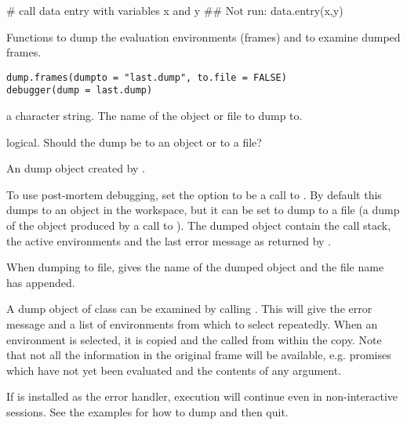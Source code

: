 %
\begin{Examples}
\begin{ExampleCode}
# call data entry with variables x and y
## Not run: data.entry(x,y)
\end{ExampleCode}
\end{Examples}
%
\begin{Description}\relax
Functions to dump the evaluation environments (frames) and to examine
dumped frames.
\end{Description}
%
\begin{Usage}
\begin{verbatim}
dump.frames(dumpto = "last.dump", to.file = FALSE)
debugger(dump = last.dump)
\end{verbatim}
\end{Usage}
%
\begin{Arguments}
\begin{ldescription}
\item[\code{dumpto}] a character string. The name of the object or file to
dump to.
\item[\code{to.file}] logical. Should the dump be to an \R{} object or to a
file?
\item[\code{dump}] An \R{} dump object created by .
\end{ldescription}
\end{Arguments}
%
\begin{Details}\relax
To use post-mortem debugging, set the option  to be a call
to .  By default this dumps to an \R{} object
 in the workspace, but it can be set to dump to a
file (a dump of the object produced by a call to ).
The dumped object contain the call stack, the active environments and
the last error message as returned by .

When dumping to file,  gives the name of the dumped
object and the file name has  appended.

A dump object of class  can be examined by calling
.  This will give the error message and a list of
environments from which to select repeatedly.  When an environment is
selected, it is copied and the  called from
within the copy.  Note that not all the information in the original
frame will be available, e.g. promises which have not yet been
evaluated and the contents of any  argument.

If  is installed as the error handler, execution
will continue even in non-interactive sessions.  See the examples for
how to dump and then quit.
\end{Details}

